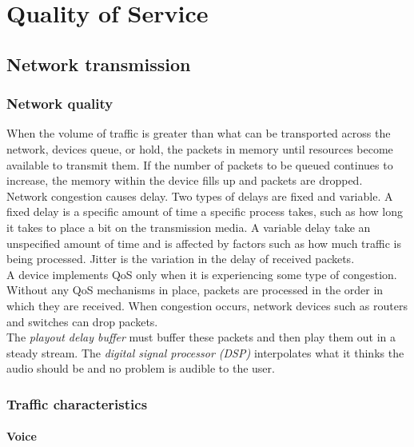 \chapter{Quality of Service}

\section{Network transmission}

\subsection{Network quality}

When the volume of traffic is greater than what can be transported across the network, devices queue, or hold, the packets in memory until resources become available to transmit them. If the number of packets to be queued continues to increase, the memory within the device fills up and packets are dropped.\\

Network congestion causes delay. Two types of delays are fixed and variable. A fixed delay is a specific amount of time a specific process takes, such as how long it takes to place a bit on the transmission media. A variable delay take an unspecified amount of time and is affected by factors such as how much traffic is being processed. Jitter is the variation in the delay of received packets.\\

A device implements QoS only when it is experiencing some type of congestion. Without any QoS mechanisms in place, packets are processed in the order in which they are received. When congestion occurs, network devices such as routers and switches can drop packets.\\

The \emph{playout delay buffer} must buffer these packets and then play them out in a steady stream. The \emph{digital signal processor (DSP)} interpolates what it thinks the audio should be and no problem is audible to the user. 

\subsection{Traffic characteristics}

\subsubsection{Voice}

